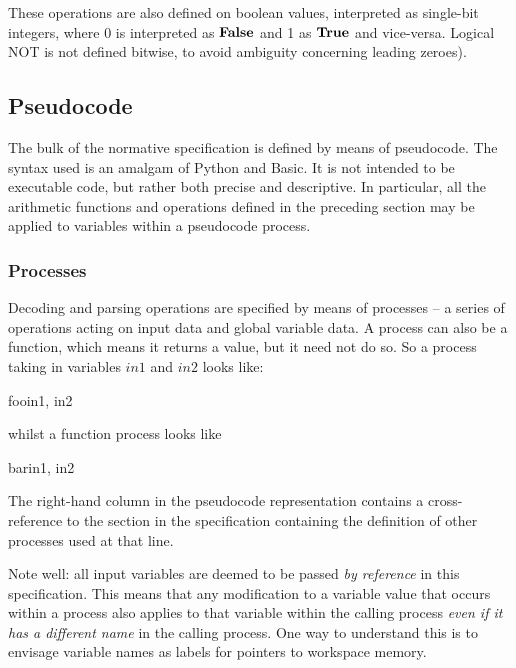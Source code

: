These operations are also defined on boolean values, interpreted as single-bit integers, 
where 0 is interpreted as $\text{\bf{False}}$ and 1 as $\text{\bf{True}}$ and vice-versa. Logical NOT is 
not defined bitwise, to avoid ambiguity concerning leading zeroes).


\subsection{Pseudocode}
\label{pseudocode}

The bulk of the normative specification is defined by means of pseudocode. 
The syntax used is an amalgam of Python and Basic. It is not intended
to be executable code, but rather both precise and descriptive. 
In particular, all the arithmetic functions and
operations defined in the preceding section may be applied to variables within
a pseudocode process.

\subsubsection{Processes}
\label{functionsprocesses}

Decoding and parsing operations are specified by means of processes
 -- a series of operations acting on input data and global variable data. 
A process can also be a function, which means it returns a value, but
it need not do so. So a process
taking in variables $in1$ and $in2$ looks like:

\begin{pseudo}{foo}{in1, in2}
\bsCODE{\hdots}
\end{pseudo}

whilst a function process looks like

\begin{pseudo}{bar}{in1, in2}
\bsCODE{\hdots}
\end{pseudo}

The right-hand column in the pseudocode representation contains a cross-reference to the 
section in the specification containing the definition of other processes used at that line.

Note well: all input variables are deemed to be passed {\em by reference} in this
specification. This means that any modification to a variable value that
occurs within a process also applies to that variable within the calling process
{\em even if it has a different name} in the calling process. One way to understand
this is to envisage variable names as labels for pointers to workspace memory.

